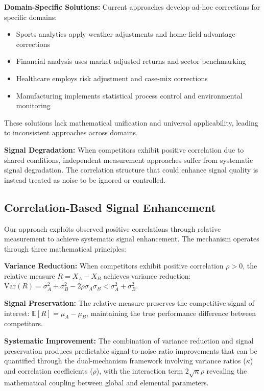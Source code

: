 \textbf{Domain-Specific Solutions:}
Current approaches develop ad-hoc corrections for specific domains:
\begin{itemize}
    \item Sports analytics apply weather adjustments and home-field advantage corrections \cite{forrest2000forecasting, boulier2003predicting, berrar2019incorporating}
    \item Financial analysis uses market-adjusted returns and sector benchmarking \cite{sharpe1994sharpe}
    \item Healthcare employs risk adjustment and case-mix corrections \cite{hanushek2010generalizations}
    \item Manufacturing implements statistical process control and environmental monitoring
\end{itemize}

These solutions lack mathematical unification and universal applicability, leading to inconsistent approaches across domains.

\textbf{Signal Degradation:}
When competitors exhibit positive correlation due to shared conditions, independent measurement approaches suffer from systematic signal degradation. The correlation structure that could enhance signal quality is instead treated as noise to be ignored or controlled.

\subsection{Correlation-Based Signal Enhancement}

Our approach exploits observed positive correlations through relative measurement to achieve systematic signal enhancement. The mechanism operates through three mathematical principles:

\textbf{Variance Reduction:} When competitors exhibit positive correlation $\rho > 0$, the relative measure $R = X_A - X_B$ achieves variance reduction: $\text{Var}(R) = \sigma^2_A + \sigma^2_B - 2\rho\sigma_A\sigma_B < \sigma^2_A + \sigma^2_B$.

\textbf{Signal Preservation:} The relative measure preserves the competitive signal of interest: $\mathbb{E}[R] = \mu_A - \mu_B$, maintaining the true performance difference between competitors.

\textbf{Systematic Improvement:} The combination of variance reduction and signal preservation produces predictable signal-to-noise ratio improvements that can be quantified through the dual-mechanism framework involving variance ratios ($\kappa$) and correlation coefficients ($\rho$), with the interaction term $2\sqrt{\kappa}\rho$ revealing the mathematical coupling between global and elemental parameters.

